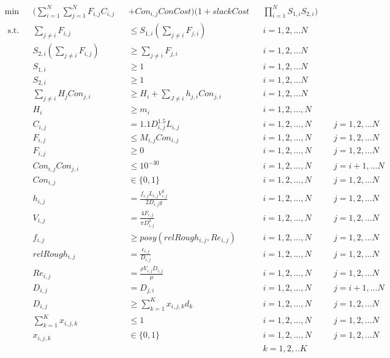\documentclass[12pt]{article}
\begin{document}
	\begin{equation}
	\begin{aligned}
	&\min &&(\sum_{i=1}^{N}\sum_{j=1}^{N} F_{i,j} C_{i,j} && + Con_{i,j} ConCost)(1 + slackCost &&\prod_{i=1}^{N}S_{1,i}S_{2,i})\\
	& \text{ s.t.} && \sum_{j \neq i} F_{i,j} && \leq S_{1,i}(\sum_{j \neq i} F_{j,i}) \quad && i = 1, 2, ... N\\
	& && S_{2,i}(\sum_{j \neq i} F_{i,j}) && \geq \sum_{j \neq i} F_{j,i} \quad && i = 1, 2, ... N\\
	& && S_{1,i} && \geq 1 \quad && i = 1, 2, ... N\\
	& && S_{2,i} && \geq 1 \quad && i = 1, 2, ... N\\
	& && \sum_{j \neq i} H_j Con_{j,i} && \geq H_i + \sum_{J \neq i} h_{j,i}Con_{j,i} && i = 1,2, ...N\\
	& && H_i && \geq m_i && i = 1, 2, ..., N \\
	& && C_{i,j} && = 1.1 D_{i,j}^{1.5} L_{i,j} && i = 1, 2, ..., N \quad && j = 1, 2, ... N\\
	& && F_{i,j} && \leq M_{i,j} Con_{i,j} && i = 1, 2, ..., N \quad && j = 1, 2, ... N\\
	& && F_{i,j} && \geq 0 && i = 1, 2, ..., N \quad && j = 1, 2, ... N\\
	& && Con_{i,j}Con_{j,i} && \leq 10^{-30} && i = 1, 2, ..., N \quad && j = i+1, ... N\\
	& && Con_{i,j} &&\in \{0,1\} && i = 1, 2, ..., N \quad && j = 1, 2, ... N\\
	& && h_{i,j} && = \frac{f_{i,j} L_{i,j} V_{i,j}^2}{2D_{i,j} g} && i = 1, 2, ..., N \quad && j = 1, 2, ... N\\
	& && V_{i,j} && = \frac{4 F_{i,j}}{\pi D_{i,j}^2} && i = 1, 2, ..., N \quad && j = 1, 2, ... N\\
	& && f_{i,j} &&\geq posy(relRough_{i,j}, Re_{i,j}) && i = 1, 2, ..., N \quad && j = 1, 2, ... N\\
	& && relRough_{i,j} && = \frac{\epsilon_{i,j}}{D_{i,j}} && i = 1, 2, ..., N \quad && j = 1, 2, ... N\\
	& && Re_{i,j} && = \frac{\rho V_{i,j} D_{i,j}}{\mu} && i = 1, 2, ..., N \quad && j = 1, 2, ... N\\
	& && D_{i,j} && = D_{j,i} && i = 1, 2, ..., N \quad && j = i+1, ... N\\
	& && D_{i,j} && \geq \sum_{k=1}^{K}x_{i,j,k}d_k && i = 1, 2, ..., N \quad && j = 1, 2, ... N\\
	& && \sum_{k=1}^{K} x_{i,j,k} && \leq 1 && i = 1, 2, ..., N \quad && j = 1, 2, ... N\\
	& && x_{i,j,k} && \in \{0,1\} && i = 1, 2, ..., N \quad && j = 1, 2, ... N \\
	& && && && k = 1,2, ..K\\ 
	\end{aligned}
	\end{equation}
	
\end{document}
